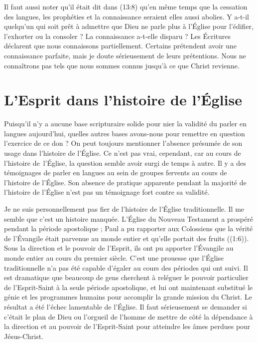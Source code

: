 Il faut aussi noter qu'il était dit dans (13:8)
 qu'en même temps que la cessation des langues,
 les prophéties et la connaissance seraient elles aussi abolies.
 Y a-t-il quelqu'un qui soit prêt à admettre
 que Dieu ne parle plus à l'Église pour l'édifier, l'exhorter ou la consoler ?
 La connaissance a-t-elle disparu ? Les Écritures déclarent que nous
 connaissons partiellement. Certains prétendent avoir une connaissance
 parfaite, mais je doute sérieusement de leurs prétentions.
 Nous ne connaîtrons pas tels que nous sommes connus jusqu'à ce que Christ
 revienne.


\section{L'Esprit dans l'histoire de l'\'Eglise}

Puisqu'il n'y a aucune base scripturaire solide pour nier la validité
 du parler en langues aujourd'hui, quelles autres bases avons-nous
 pour remettre en question l'exercice de ce don ?
 On peut toujours mentionner
 l'absence présumée de son usage dans l'histoire de l'Église.
 Ce n'est pas vrai, cependant, car au cours de l'histoire de~l'Église,
 la question semble avoir surgi de temps à autre.
 Il y a des témoignages de parler en langues au sein de groupes fervents
 au cours de l'histoire de l'Église. Son absence de pratique apparente
 pendant la majorité de l'histoire de l'Église n'est pas un témoignage
 fort contre sa validité.

Je ne suis personnellement pas fier de l'histoire de l'Église traditionnelle.
 Il me semble que c'est un histoire manquée. L'Église du Nouveau Testament
 a prospéré pendant la période apostolique ; Paul a pu rapporter aux
 Colossiens que la vérité de l'Évangile était parvenue au monde entier
 et qu'elle portait des fruits ((1:6)).
 Sous la direction et le pouvoir de l'Esprit, ils ont pu apporter l'Évangile
 au monde entier au cours du premier siècle. C'est une prouesse
 que l'Église traditionnelle n'a pas été capable d'égaler au cours
 des périodes qui ont suivi. Il est dramatique que beaucoup de gens
 cherchent à reléguer le pouvoir particulier de l'Esprit-Saint à la seule période
 apostolique, et lui ont maintenant substitué le génie et les programmes
 humains pour accomplir la grande mission du Christ.
 Le résultat a été l'échec lamentable de l'Église.
 Il faut sérieusement se demander si c'était le plan de Dieu ou l'orgueil
 de l'homme de mettre de côté la dépendance à la direction et au pouvoir
 de l'Esprit-Saint pour atteindre les âmes perdues pour Jésus-Christ.

